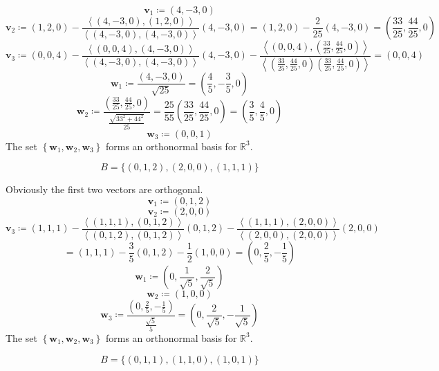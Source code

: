 \documentclass[12pt, letterpaper]{report}
\begin{document}
\begin{solution}
    \[
        \mathbf{v} _1\coloneqq (4,-3,0)
    \]
    \[
        \mathbf{v} _2\coloneqq (1,2,0)-\frac{\left\langle (4,-3,0),(1,2,0) \right\rangle }{\left\langle (4,-3,0),(4,-3,0) \right\rangle }(4,-3,0)=(1,2,0)-\frac{2}{25}(4,-3,0)=\left( \frac{33}{25},\frac{44}{25},0 \right) 
    \]
    \[
        \mathbf{v} _3\coloneqq (0,0,4)-\frac{\left\langle (0,0,4),(4,-3,0) \right\rangle }{\left\langle (4,-3,0),(4,-3,0) \right\rangle }(4,-3,0)-\frac{\left\langle (0,0,4),\left( \frac{33}{25},\frac{44}{25},0 \right)  \right\rangle }{\left\langle \left( \frac{33}{25},\frac{44}{25},0 \right)\left( \frac{33}{25},\frac{44}{25},0 \right)   \right\rangle }=(0,0,4)
    \]
    \[
        \mathbf{w}_1 \coloneqq \frac{\left( 4,-3,0 \right) }{\sqrt{25} }=\left( \frac{4}{5},-\frac{3}{5},0 \right) 
    \]
    \[
        \mathbf{w}_2\coloneqq \frac{\left( \frac{33}{25},\frac{44}{25},0 \right) }{\frac{\sqrt{33^2 +44^2} }{25}}=\frac{25}{55}\left( \frac{33}{25},\frac{44}{25},0 \right) =\left( \frac{3}{5},\frac{4}{5},0 \right) 
    \]
    \[
        \mathbf{w} _3\coloneqq (0,0,1)
    \]
    The set \(\left\{ \mathbf{w} _1,\mathbf{w} _2,\mathbf{w} _3 \right\} \) forms an orthonormal basis for \(\mathbb{R} ^3\).
\end{solution}
\begin{exercise}
    \[
        B=\{ (0,1,2),(2,0,0),(1,1,1) \} 
    \]
\end{exercise}
\begin{solution}
    Obviously the first two vectors are orthogonal.
    \[
        \mathbf{v} _1\coloneqq (0,1,2)
    \]
    \[
        \mathbf{v} _2\coloneqq (2,0,0)
    \]
    \[
        \mathbf{v} _3\coloneqq (1,1,1)-\frac{\left\langle (1,1,1),(0,1,2) \right\rangle }{\left\langle (0,1,2),(0,1,2) \right\rangle }(0,1,2)-\frac{\left\langle (1,1,1),(2,0,0) \right\rangle }{\left\langle (2,0,0),(2,0,0) \right\rangle }(2,0,0)
    \]
    \[
        =(1,1,1)-\frac{3}{5}(0,1,2)-\frac{1}{2}(1,0,0)=\left( 0,\frac{2}{5},-\frac{1}{5} \right) 
    \]
    \[
        \mathbf{w} _1\coloneqq \left( 0,\frac{1}{\sqrt{5} },\frac{2}{\sqrt{5} } \right) 
    \]
    \[
        \mathbf{w} _2\coloneqq \left( 1,0,0 \right) 
    \]
    \[
        \mathbf{w} _3\coloneqq \frac{\left( 0,\frac{2}{5},-\frac{1}{5} \right) }{\frac{\sqrt{5} }{5}}=\left( 0,\frac{2}{\sqrt{5} },-\frac{1}{\sqrt{5} } \right) 
    \]
    The set \(\left\{ \mathbf{w} _1,\mathbf{w} _2,\mathbf{w} _3 \right\} \) forms an orthonormal basis for \(\mathbb{R} ^3\).
\end{solution}
\begin{exercise}
    \[
        B=\{ (0,1,1),(1,1,0),(1,0,1) \} 
    \]
\end{exercise}
\end{document}
